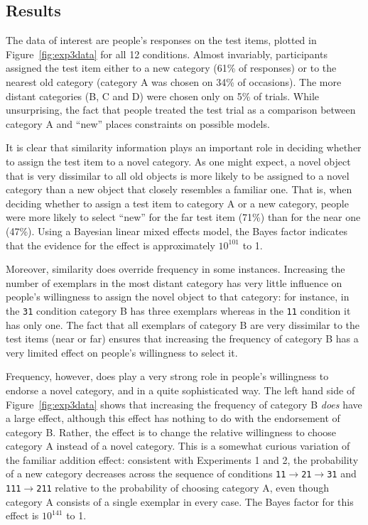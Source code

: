 \documentclass[doc]{apa6}
\newcommand{\dist}[1]{\texttt{#1}}
\newcommand{\goesto}{$\rightarrow$}
\begin{document}
\subsection{Results}

The data of interest are people's responses on the test items, plotted in Figure~\ref{fig:exp3data} for all 12 conditions. Almost invariably, participants assigned the test item either to a new category (61\% of responses) or to the nearest old category (category A was chosen on 34\% of occasions). The more distant categories (B, C and D) were chosen only on 5\% of trials. While unsurprising, the fact that people treated the test trial as a comparison between category A and ``new'' places constraints on  possible models.

It is clear that similarity information plays an important role in deciding whether to assign the test item to a novel category. As one might expect, a novel object that is very dissimilar to all old objects is more likely to be assigned to a novel category than a new object that closely resembles a familiar one. That is, when deciding whether to assign a test item to category A or a new category, people were more likely to select ``new'' for the far test item (71\%) than for the near one (47\%). Using a Bayesian linear mixed effects model, the Bayes factor indicates that the evidence for the effect is approximately $10^{101}$ to 1.

Moreover, similarity does override frequency in some instances. Increasing the number of exemplars in the most distant category has very little influence on people's willingness to assign the novel object to that category: for instance, in the \dist{31} condition category B has three exemplars whereas in the \dist{11} condition it has only one. The fact that all exemplars of category B are very dissimilar to the test items (near or far) ensures that increasing the frequency of category B has a very limited effect on people's willingness to select it.

Frequency, however, does play a very strong role in people's willingness to endorse a novel category, and in a quite sophisticated way. The left hand side of Figure~\ref{fig:exp3data} shows that increasing the frequency of category B {\it does} have a large effect, although this effect has nothing to do with the endorsement of category B. Rather, the effect is to change the relative willingness to choose category A instead of  a novel category. This is a somewhat curious variation of the familiar addition effect: consistent with Experiments 1 and 2, the probability of a new category decreases across the sequence of conditions \dist{11}\goesto\dist{21}\goesto\dist{31} and \dist{111}\goesto\dist{211} relative to the probability of choosing category A, even though category A consists of a single exemplar in every case. The Bayes factor for this effect is $10^{141}$ to 1.
\end{document}

